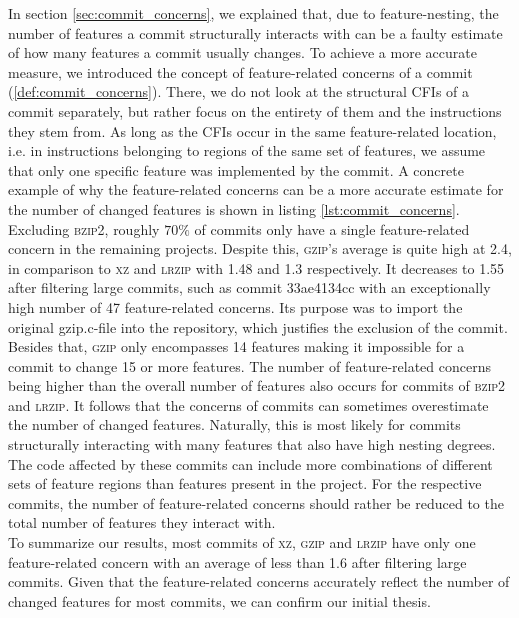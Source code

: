 In section \ref{sec:commit_concerns}, we explained that, due to feature-nesting, the number of features a commit structurally interacts with can be a faulty estimate of how many features a commit usually changes.
To achieve a more accurate measure, we introduced the concept of feature-related concerns of a commit (\ref{def:commit_concerns}).
There, we do not look at the structural CFIs of a commit separately, but rather focus on the entirety of them and the instructions they stem from.
As long as the CFIs occur in the same feature-related location, i.e. in instructions belonging to regions of the same set of features, we assume that only one specific feature was implemented by the commit.
A concrete example of why the feature-related concerns can be a more accurate estimate for the number of changed features is shown in listing \ref{lst:commit_concerns}.
Excluding \textsc{bzip2}, roughly $70\%$ of commits only have a single feature-related concern in the remaining projects.
Despite this, \textsc{gzip}'s average is quite high at 2.4, in comparison to \textsc{xz} and \textsc{lrzip} with 1.48 and 1.3 respectively.
It decreases to 1.55 after filtering large commits, such as commit \textsf{33ae4134cc} with an exceptionally high number of 47 feature-related concerns.
Its purpose was to import the original \textsf{gzip.c}-file into the repository, which justifies the exclusion of the commit.
Besides that, \textsc{gzip} only encompasses 14 features making it impossible for a commit to change 15 or more features.
The number of feature-related concerns being higher than the overall number of features also occurs for commits of \textsc{bzip2} and \textsc{lrzip}.
It follows that the concerns of commits can sometimes overestimate the number of changed features.
Naturally, this is most likely for commits structurally interacting with many features that also have high nesting degrees.
The code affected by these commits can include more combinations of different sets of feature regions than features present in the project.
For the respective commits, the number of feature-related concerns should rather be reduced to the total number of features they interact with. \\
To summarize our results, most commits of \textsc{xz}, \textsc{gzip} and \textsc{lrzip} have only one feature-related concern with an average of less than 1.6 after filtering large commits. 
Given that the feature-related concerns accurately reflect the number of changed features for most commits, we can confirm our initial thesis. 
